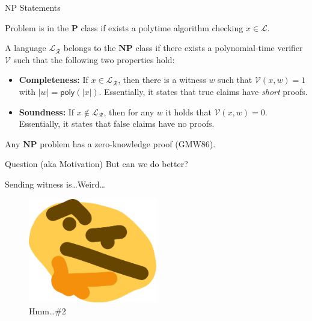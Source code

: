 \documentclass[xcolor={usenames,dvipsnames}]{beamer}
\begin{document}
    \begin{frame}{NP Statements}
        \begin{definition}[P Language]
            Problem is in the $\mathbf{P}$ class if exists a polytime algorithm checking $x \in \mathcal{L}$.\pause
        \end{definition}

        \begin{definition}[NP Language]
            A language $\mathcal{L}_{\mathcal{R}}$ belongs to the $\mathbf{NP}$ class if there exists a polynomial-time verifier $\mathcal{V}$ such that the following two properties hold:\pause
            \begin{itemize}
                \item \textbf{Completeness:} If $x \in \mathcal{L}_{\mathcal{R}}$, then there is a witness $w$ such that $\mathcal{V}(x, w) = 1$ with $|w| = \mathsf{poly}(|x|)$. Essentially, it states that true claims have \textit{short} proofs.\pause
                \item \textbf{Soundness:} If $x \not\in \mathcal{L}_{\mathcal{R}}$, then for any $w$ it holds that $\mathcal{V}(x, w) = 0$. Essentially, it states that false claims have no proofs.\pause
            \end{itemize}
        \end{definition}

        \begin{theorem}
            Any $\mathbf{NP}$ problem has a zero-knowledge proof (GMW86).
        \end{theorem}
    \end{frame}

    \begin{frame}{Question (aka Motivation)}
        But can we do better?\pause

        Sending witness is\ldots Weird\ldots

        \begin{figure}
            \centering
            \includegraphics[width=0.5\textwidth]{images/lecture_6/thonk.png}
            \caption{Hmm\ldots \#2}
        \end{figure}
    \end{frame}
\end{document}
